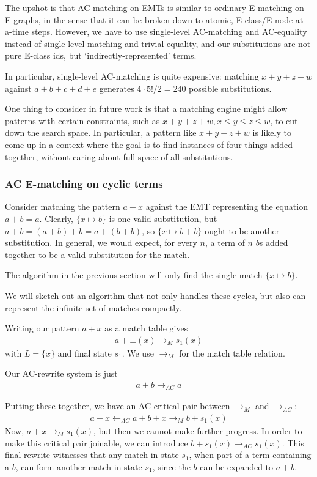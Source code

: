 \documentclass[12pt,a4paper,twoside,openright]{report}
\numberwithin{equation}{chapter}		%
\numberwithin{figure}{chapter}			%
\numberwithin{table}{chapter}			%
\theoremstyle{definition}
\theoremstyle{plain}
\begin{document}
The upshot is that AC-matching on EMTs is similar to ordinary E-matching on E-graphs, in the sense that it can be broken down to atomic, E-class/E-node-at-a-time steps. However, we have to use single-level AC-matching and AC-equality instead of single-level matching and trivial equality, and our substitutions are not pure E-class ids, but `indirectly-represented' terms.

In particular, single-level AC-matching is quite expensive: matching $x + y + z + w$ against $a + b + c + d + e$ generates $4 \cdot 5! / 2 = 240$ possible substitutions.

One thing to consider in future work is that a matching engine might allow patterns with certain constraints, such as $x + y + z + w, x \le y \le z \le w$, to cut down the search space. In particular, a pattern like $x + y + z + w$ is likely to come up in a context where the goal is to find instances of four things added together, without caring about full space of all substitutions.

\subsubsection{AC E-matching on cyclic terms} \label{matchcyc}
Consider matching the pattern $a + x$ against the EMT representing the equation $a + b = a$. Clearly, $\{x \mapsto b\}$ is one valid substitution, but $a + b = (a + b) + b = a + (b + b)$, so $\{x \mapsto b + b\}$ ought to be another substitution. In general, we would expect, for every $n$, a term of $n$ $b$s added together to be a valid substitution for the match.

The algorithm in the previous section will only find the single match $\{x \mapsto b\}$. 

We will sketch out an algorithm that not only handles these cycles, but also can represent the infinite set of matches compactly.

Writing our pattern $a + x$ as a match table gives 
\begin{align*}
	a + \bot(x) \rightarrow_M s_1(x)
\end{align*}
with $L = \{x\}$ and final state $s_1$. We use $\rightarrow_M$ for the match table relation.

Our AC-rewrite system is just
\begin{align*}
	a + b \rightarrow_{AC} a
\end{align*}

Putting these together, we have an AC-critical pair between $\rightarrow_M$ and $\rightarrow_{AC}$:
\begin{align*}
	a + x \leftarrow_{AC} a + b + x \rightarrow_M b + s_1(x)
\end{align*}
Now, $a + x \rightarrow_M s_1(x)$, but then we cannot make further progress. In order to make this critical pair joinable, we can introduce $b + s_1(x) \rightarrow_{AC} s_1(x)$. This final rewrite witnesses that any match in state $s_1$, when part of a term containing a $b$, can form another match in state $s_1$, since the $b$ can be expanded to $a + b$.
\end{document}
